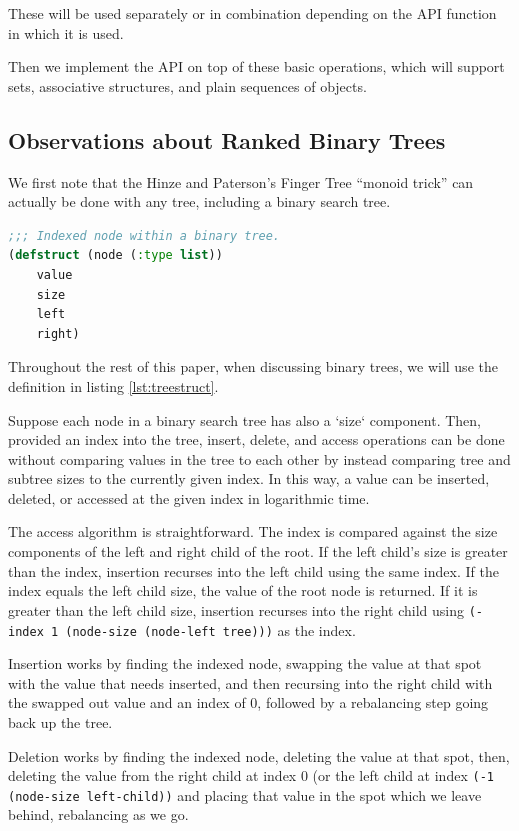 \documentclass[sigconf]{acmart}
\begin{document}
These will be used separately or in combination depending on the API function in
which it is used.

Then we implement the API on top of these basic operations, which will support
sets, associative structures, and plain sequences of objects.

\subsection{Observations about Ranked Binary Trees}

We first note that the Hinze and Paterson's Finger Tree ``monoid
trick''\cite{Hinze-Paterson:FingerTree} can actually be done with any tree,
including a binary search tree.

\begin{lstlisting}[caption={Our indexed binary tree type.}, label={lst:treestruct}, language=Lisp]
;;; Indexed node within a binary tree.
(defstruct (node (:type list))
    value
    size
    left
    right)
\end{lstlisting}

Throughout the rest of this paper, when discussing binary trees, we will use
the definition in listing \ref{lst:treestruct}.

Suppose each node in a binary search tree has also a `size` component. Then,
provided an index into the tree, insert, delete, and access operations can
be done without comparing values in the tree to each other by instead comparing
tree and subtree sizes to the currently given index. In this way, a value
can be inserted, deleted, or accessed at the given index in logarithmic time.

The access algorithm is straightforward. The index is compared against the size
components of the left and right child of the root. If the left child's size
is greater than the index, insertion recurses into the left child using the same
index. If the index equals the left child size, the value of the root node is returned.
If it is greater than the left child size, insertion recurses into the right
child using \texttt{(- index 1 (node-size (node-left tree)))} as the index.

Insertion works by finding the indexed node, swapping the value at that spot
with the value that needs inserted, and then recursing into the right child with
the swapped out value and an index of 0, followed by a rebalancing step going
back up the tree.

Deletion works by finding the indexed node, deleting the value at that spot,
then, deleting the value from the right child at index 0 (or the left child at
index \texttt{(-1 (node-size left-child))} and placing that value in the spot
which we leave behind, rebalancing as we go.
\end{document}
